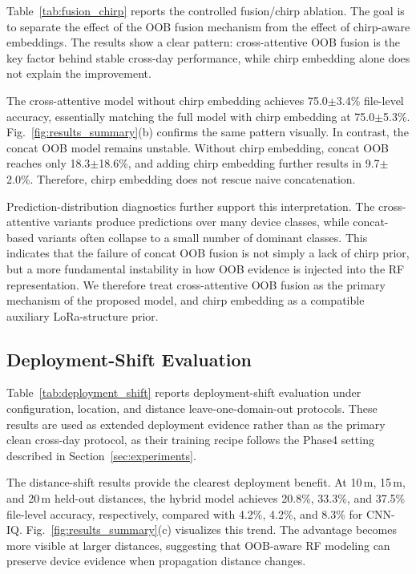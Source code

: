 Table~\ref{tab:fusion_chirp} reports the controlled fusion/chirp ablation. The goal is to separate the effect of the OOB fusion mechanism from the effect of chirp-aware embeddings. The results show a clear pattern: cross-attentive OOB fusion is the key factor behind stable cross-day performance, while chirp embedding alone does not explain the improvement.



The cross-attentive model without chirp embedding achieves 75.0$\pm$3.4\% file-level accuracy, essentially matching the full model with chirp embedding at 75.0$\pm$5.3\%. Fig.~\ref{fig:results_summary}(b) confirms the same pattern visually. In contrast, the concat OOB model remains unstable. Without chirp embedding, concat OOB reaches only 18.3$\pm$18.6\%, and adding chirp embedding further results in 9.7$\pm$2.0\%. Therefore, chirp embedding does not rescue naive concatenation.

Prediction-distribution diagnostics further support this interpretation. The cross-attentive variants produce predictions over many device classes, while concat-based variants often collapse to a small number of dominant classes. This indicates that the failure of concat OOB fusion is not simply a lack of chirp prior, but a more fundamental instability in how OOB evidence is injected into the RF representation. We therefore treat cross-attentive OOB fusion as the primary mechanism of the proposed model, and chirp embedding as a compatible auxiliary LoRa-structure prior.

\subsection{Deployment-Shift Evaluation}

Table~\ref{tab:deployment_shift} reports deployment-shift evaluation under configuration, location, and distance leave-one-domain-out protocols. These results are used as extended deployment evidence rather than as the primary clean cross-day protocol, as their training recipe follows the Phase4 setting described in Section~\ref{sec:experiments}.



The distance-shift results provide the clearest deployment benefit. At 10\,m, 15\,m, and 20\,m held-out distances, the hybrid model achieves 20.8\%, 33.3\%, and 37.5\% file-level accuracy, respectively, compared with 4.2\%, 4.2\%, and 8.3\% for CNN-IQ. Fig.~\ref{fig:results_summary}(c) visualizes this trend. The advantage becomes more visible at larger distances, suggesting that OOB-aware RF modeling can preserve device evidence when propagation distance changes.

